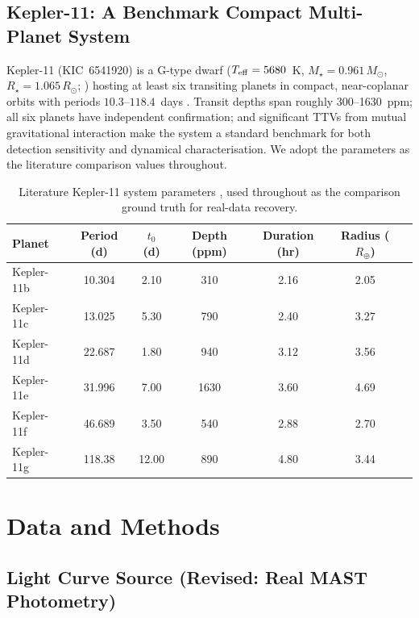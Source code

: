 \documentclass[11pt]{article}
\begin{document}
\subsection{Kepler-11: A Benchmark Compact Multi-Planet System}

Kepler-11 (KIC~6541920) is a G-type dwarf ($T_{\rm eff} = 5680$~K, $M_\star = 0.961\,M_\odot$, $R_\star = 1.065\,R_\odot$; \citealt{Lissauer2011}) hosting at least six transiting planets in compact, near-coplanar orbits with periods $10.3$--$118.4$~days \citep{Lissauer2013}. Transit depths span roughly 300--1630~ppm; all six planets have independent confirmation; and significant TTVs from mutual gravitational interaction make the system a standard benchmark for both detection sensitivity and dynamical characterisation. We adopt the \citet{Lissauer2011,Lissauer2013} parameters as the literature comparison values throughout.

\begin{table}[h]
\centering
\caption{Literature Kepler-11 system parameters \citep{Lissauer2011,Lissauer2013}, used throughout as the comparison ground truth for real-data recovery.}
\label{tab:literature}
\begin{tabular}{lcccccc}
\toprule
Planet & Period (d) & $t_0$ (d) & Depth (ppm) & Duration (hr) & Radius ($R_\oplus$) \\
\midrule
Kepler-11b & 10.304 & 2.10 & 310 & 2.16 & 2.05 \\
Kepler-11c & 13.025 & 5.30 & 790 & 2.40 & 3.27 \\
Kepler-11d & 22.687 & 1.80 & 940 & 3.12 & 3.56 \\
Kepler-11e & 31.996 & 7.00 & 1630 & 3.60 & 4.69 \\
Kepler-11f & 46.689 & 3.50 & 540 & 2.88 & 2.70 \\
Kepler-11g & 118.38 & 12.00 & 890 & 4.80 & 3.44 \\
\bottomrule
\end{tabular}
\end{table}

\section{Data and Methods}

\subsection{Light Curve Source (Revised: Real MAST Photometry)}
\label{sec:data}
\end{document}
